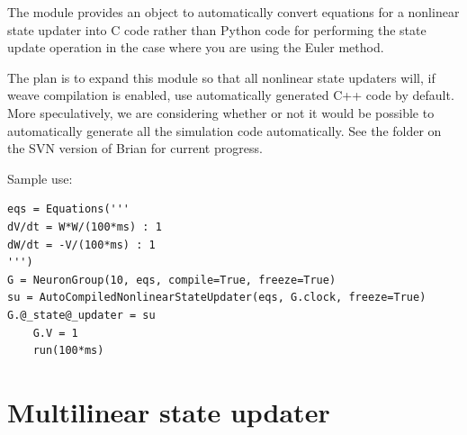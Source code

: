 \documentclass[letterpaper,10pt,english]{manual}
\begin{document}
The  module provides an object 
to automatically convert equations for a nonlinear state updater into C code rather than Python code
for performing the state update operation in the case where you are using the Euler method.

The plan is to expand this module so that all nonlinear state updaters will, if weave compilation is
enabled, use automatically generated C++ code by default. More speculatively, we are considering
whether or not it would be possible to automatically generate all the simulation code automatically.
See the  folder on the SVN version of Brian for current progress.

Sample use:

\begin{Verbatim}[commandchars=@\[\]]
eqs = Equations('''
dV/dt = W*W/(100*ms) : 1
dW/dt = -V/(100*ms) : 1
''')
G = NeuronGroup(10, eqs, compile=True, freeze=True)
su = AutoCompiledNonlinearStateUpdater(eqs, G.clock, freeze=True)
G.@_state@_updater = su
    G.V = 1
    run(100*ms)
\end{Verbatim}

\resetcurrentobjects
\hypertarget{--doc-experimental-multilinearstateupdater}{}

\section{Multilinear state updater}
\end{document}
